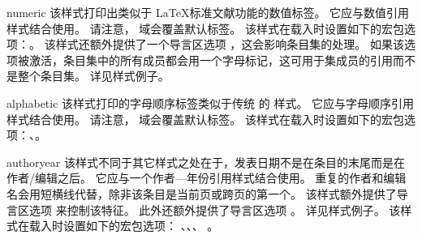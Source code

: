 \begin{marglist}

\item[numeric]
该样式打印出类似于 \LaTeX 标准文献功能的数值标签。
它应与数值引用样式结合使用。
请注意， 域会覆盖默认标签。
该样式在载入时设置如下的宏包选项：。
该样式还额外提供了一个导言区选项 ，这会影响条目集的处理。
如果该选项被激活，条目集中的所有成员都会用一个字母标记，这可用于集成员的引用而不是整个条目集。
详见样式例子。

\item[alphabetic]
该样式打印的字母顺序标签类似于传统 \BibTeX 的  样式。
它应与字母顺序引用样式结合使用。
请注意， 域会覆盖默认标签。
该样式在载入时设置如下的宏包选项：、。

\item[authoryear]
该样式不同于其它样式之处在于，发表日期不是在条目的末尾而是在作者/编辑之后。
它应与一个作者---年份引用样式结合使用。
重复的作者和编辑名会用短横线代替，除非该条目是当前页或跨页的第一个。
该样式额外提供了导言区选项  来控制该特征。
此外还额外提供了导言区选项 。
详见样式例子。
该样式在载入时设置如下的宏包选项：
、、、 。


\end{marglist}
